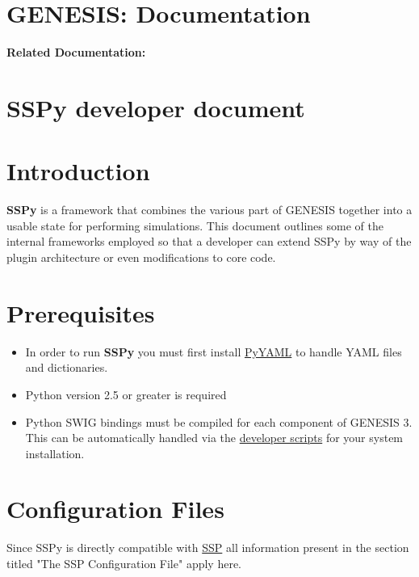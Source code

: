 \documentclass[12pt]{article}
\begin{document}
\section*{GENESIS: Documentation}

{\bf Related Documentation:}

\section*{SSPy developer document}

\section*{Introduction}

	{\bf SSPy} is a framework that combines the various part of GENESIS together into a usable state for performing simulations. This document outlines some of the internal frameworks employed so that a developer can extend SSPy by way of the plugin architecture or even modifications to core code. 

\section*{Prerequisites}

\begin{itemize}
\item In order to run {\bf SSPy} you must first install \href{http://pyyaml.org/}{PyYAML} to handle YAML files and dictionaries.

\item Python version 2.5 or greater is required

\item Python SWIG bindings must be compiled for each component of GENESIS 3. This can be automatically handled via the \href{../developer-installation/developer-installation.tex}{developer scripts} for your system installation.
\end{itemize}


\section*{Configuration Files}

Since SSPy is directly compatible with \href{../ssp/ssp.tex}{SSP} all information present in the section titled "The SSP Configuration File" apply here. 
\end{document}
